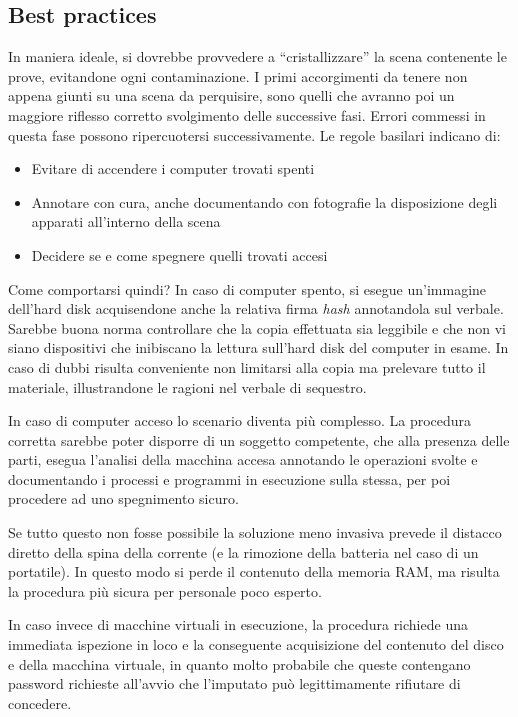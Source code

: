 \subsection{Best practices}

In maniera ideale, si dovrebbe provvedere a ``cristallizzare'' la scena contenente le prove, evitandone ogni contaminazione.
I primi accorgimenti da tenere non appena giunti su una scena da perquisire, sono quelli che avranno poi un maggiore riflesso corretto svolgimento delle successive fasi. Errori commessi in questa fase possono ripercuotersi successivamente. Le regole basilari indicano di: 

\begin{itemize}
	
	\item{Evitare di accendere i computer trovati spenti} 
	
	\item{Annotare con cura, anche documentando con fotografie la disposizione degli apparati all'interno della scena} 
	
	\item{Decidere se e come spegnere quelli trovati accesi}

\end{itemize}

Come comportarsi quindi? In caso di computer spento, si esegue un'immagine dell'hard disk acquisendone anche la relativa firma \textit{hash} annotandola sul verbale. Sarebbe buona norma controllare che la copia effettuata sia leggibile e che non vi siano dispositivi che inibiscano la lettura sull'hard disk del computer in esame. In caso di dubbi risulta conveniente non limitarsi alla copia ma prelevare tutto il materiale, illustrandone le ragioni nel verbale di sequestro.

In caso di computer acceso lo scenario diventa più complesso. La procedura corretta sarebbe poter disporre di un soggetto competente, che alla presenza delle parti, esegua l'analisi della macchina accesa annotando le operazioni svolte e documentando i processi e programmi in esecuzione sulla stessa, per poi procedere ad uno spegnimento sicuro.

Se tutto questo non fosse possibile la soluzione meno invasiva prevede il distacco diretto della spina della corrente (e la rimozione della batteria nel caso di un portatile). In questo modo si perde il contenuto della memoria RAM, ma risulta la procedura più sicura per personale poco esperto.

In caso invece di macchine virtuali in esecuzione, la procedura richiede una immediata ispezione in loco e la conseguente acquisizione del contenuto del disco e della macchina virtuale, in quanto molto probabile che queste contengano password richieste all'avvio che l'imputato può legittimamente rifiutare di concedere.

